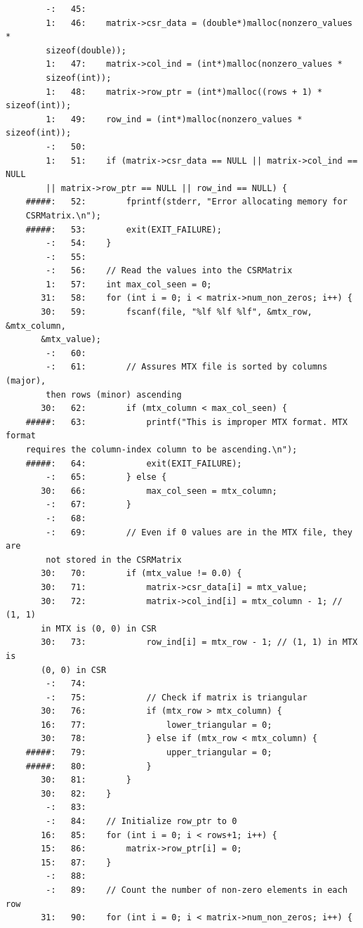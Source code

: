 \documentclass[12pt]{article}
\begin{document}
\begin{mdframed}[style=myboxstyleTerminal1]
\begin{verbatim}
        -:   45:
        1:   46:    matrix->csr_data = (double*)malloc(nonzero_values * 
        sizeof(double));
        1:   47:    matrix->col_ind = (int*)malloc(nonzero_values * 
        sizeof(int));
        1:   48:    matrix->row_ptr = (int*)malloc((rows + 1) * sizeof(int));
        1:   49:    row_ind = (int*)malloc(nonzero_values * sizeof(int));
        -:   50:
        1:   51:    if (matrix->csr_data == NULL || matrix->col_ind == NULL
        || matrix->row_ptr == NULL || row_ind == NULL) {
    #####:   52:        fprintf(stderr, "Error allocating memory for 
    CSRMatrix.\n");
    #####:   53:        exit(EXIT_FAILURE);
        -:   54:    }
        -:   55:
        -:   56:    // Read the values into the CSRMatrix
        1:   57:    int max_col_seen = 0;
       31:   58:    for (int i = 0; i < matrix->num_non_zeros; i++) {
       30:   59:        fscanf(file, "%lf %lf %lf", &mtx_row, &mtx_column, 
       &mtx_value);
        -:   60:
        -:   61:        // Assures MTX file is sorted by columns (major), 
        then rows (minor) ascending
       30:   62:        if (mtx_column < max_col_seen) {
    #####:   63:            printf("This is improper MTX format. MTX format 
    requires the column-index column to be ascending.\n");
    #####:   64:            exit(EXIT_FAILURE);
        -:   65:        } else {
       30:   66:            max_col_seen = mtx_column;
        -:   67:        }
        -:   68:
        -:   69:        // Even if 0 values are in the MTX file, they are 
        not stored in the CSRMatrix
       30:   70:        if (mtx_value != 0.0) {
       30:   71:            matrix->csr_data[i] = mtx_value;
       30:   72:            matrix->col_ind[i] = mtx_column - 1; // (1, 1) 
       in MTX is (0, 0) in CSR
       30:   73:            row_ind[i] = mtx_row - 1; // (1, 1) in MTX is 
       (0, 0) in CSR
        -:   74:
        -:   75:            // Check if matrix is triangular
       30:   76:            if (mtx_row > mtx_column) {
       16:   77:                lower_triangular = 0;
       30:   78:            } else if (mtx_row < mtx_column) {
    #####:   79:                upper_triangular = 0;
    #####:   80:            }
       30:   81:        }
       30:   82:    }
        -:   83:
        -:   84:    // Initialize row_ptr to 0
       16:   85:    for (int i = 0; i < rows+1; i++) {
       15:   86:        matrix->row_ptr[i] = 0;
       15:   87:    }
        -:   88:
        -:   89:    // Count the number of non-zero elements in each row
       31:   90:    for (int i = 0; i < matrix->num_non_zeros; i++) {

\end{verbatim}
\end{mdframed}
\end{document}
